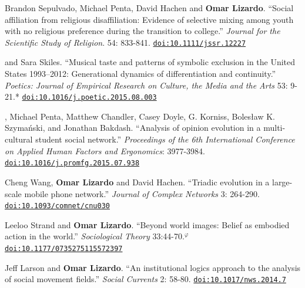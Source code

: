 
\ind Brandon Sepulvado, Michael Penta, David Hachen and {\bf Omar Lizardo}. ``Social affiliation from religious disaffiliation: Evidence of selective mixing among youth with no religious preference during the transition to college.'' {\em Journal for the Scientific Study of Religion}. 54: 833-841. \href{https://doi.org/10.1111/jssr.12227}{\nolinkurl{doi:10.1111/jssr.12227}}

 and Sara Skiles. ``Musical taste and patterns of symbolic exclusion in the United States 1993–2012: Generational dynamics of differentiation and continuity.'' {\em Poetics: Journal of Empirical Research on Culture, the Media and the Arts}  53: 9-21.\textcolor{uclablue}{*} \href{https://doi.org/10.1016/j.poetic.2015.08.003}{\nolinkurl{doi:10.1016/j.poetic.2015.08.003}}

, Michael Penta, Matthew Chandler, Casey Doyle, G. Korniss, Boles\l{}aw K. Szyma\'{n}ski, and Jonathan Bakdash. ``Analysis of opinion evolution in a multi-cultural student social network.''  {\em Proceedings of the 6th International Conference on Applied Human Factors and Ergonomics}: 3977-3984. \href{https://doi.org/10.1016/j.promfg.2015.07.938}{\nolinkurl{doi:10.1016/j.promfg.2015.07.938}}

\ind Cheng Wang, {\bf Omar Lizardo} and David Hachen. ``Triadic evolution in a large-scale mobile phone network.'' {\em Journal of Complex Networks} 3: 264-290. \href{https://doi.org/10.1093/comnet/cnu030}{\nolinkurl{doi:10.1093/comnet/cnu030}}

\ind Leeloo Strand and {\bf Omar Lizardo}. ``Beyond world images: Belief as embodied action in the world.'' {\em Sociological Theory} 33:44-70.\textcolor{black}{$^{\varphi}$} \href{https://doi.org/10.1177/0735275115572397}{\nolinkurl{doi:10.1177/0735275115572397}}

\ind Jeff Larson and {\bf Omar Lizardo}. ``An institutional logics approach to the analysis of social movement fields.'' {\em Social Currents} 2: 58-80. \href{https://doi.org/10.1017/nws.2014.7}{\nolinkurl{doi:10.1017/nws.2014.7}}
